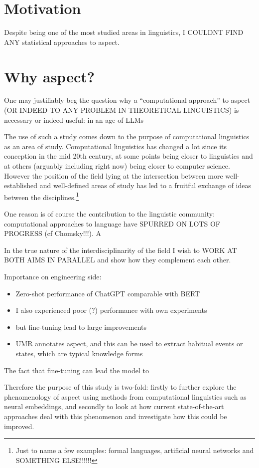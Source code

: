 \section*{Motivation}
Despite being one of the most studied areas in linguistics, I COULDNT FIND ANY statistical approaches to aspect. 
\section*{Why aspect?}
One may justifiably beg the question why a “computational approach” to aspect (OR INDEED TO ANY PROBLEM IN THEORETICAL LINGUISTICS) is necessary or indeed useful: in an age of LLMs

The use of such a study comes down to the purpose of computational linguistics as an area of study. Computational linguistics has changed a lot since its conception in the mid 20th century, at some points being closer to linguistics and at others (arguably including right now) being closer to computer science. However the position of the field lying at the intersection between more well-established and well-defined areas of study has led to a fruitful exchange of ideas between the disciplines.\footnote{Just to name a few examples: formal languages, artificial neural networks and SOMETHING ELSE!!!!!!}

One reason is of course the contribution to the linguistic community: computational approaches to language have SPURRED ON LOTS OF PROGRESS (cf Chomsky!!!). A 

In the true nature of the interdisciplinarity of the field I wish to WORK AT BOTH AIMS IN PARALLEL and show how they complement each other.

Importance on engineering side:
\begin{itemize}
    \item{Zero-shot performance of ChatGPT comparable with BERT \citep{zhong2023chatgpt}}
    \item{I also experienced poor (?) performance with own experiments}
    \item{but fine-tuning lead to large improvements}
    \item UMR annotates aspect, and this can be used to extract habitual events or states, which are typical knowledge forms
\end{itemize}

The fact that fine-tuning can lead the model to 

Therefore the purpose of this study is two-fold: firstly to further explore the phenomenology of aspect using methods from computational linguistics such as neural embeddings, and secondly to look at how current state-of-the-art approaches deal with this phenomenon and investigate how this could be improved.


